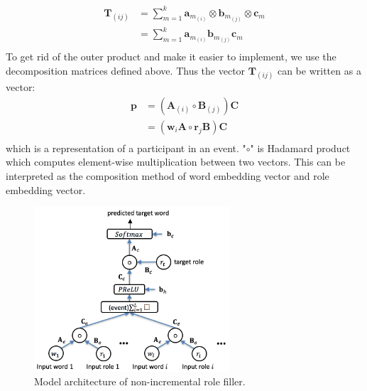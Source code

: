 \documentclass[a4paper]{article}
\begin{document}
\begin{equation} \label{eq:rbwe_tensor}
\begin{aligned}
    \mathbf{T}_{(ij)}
        &= \sum_{m=1}^{k} \mathbf{a}_{m_{(i)}} \otimes \mathbf{b}_{m_{(j)}} \otimes \mathbf{c}_m \\
        &= \sum_{m=1}^{k} \mathbf{a}_{m_{(i)}} \mathbf{b}_{m_{(j)}}  \mathbf{c}_m \\
\end{aligned}
\end{equation}
\noindent
To get rid of the outer product and make it easier to implement, we use the decomposition matrices defined above. Thus the vector $\mathbf{T}_{(ij)}$ can be written as a vector: 
\begin{equation} \label{eq:rbwe}
\begin{aligned}
    \mathbf{p} 
        &= (\mathbf{A}_{(i)}\circ \mathbf{B}_{(j)}) \mathbf{C} \\
        &= (\mathbf{w}_i \mathbf{A} \circ \mathbf{r}_j \mathbf{B}) \mathbf{C} \\
\end{aligned}
\end{equation}
which is a representation of a participant in an event. "$\circ$" is Hadamard product which computes element-wise multiplication between two vectors. This can be interpreted as the composition method of word embedding vector and role embedding vector. 



\begin{figure}[t]
\centering
\includegraphics[width=0.65\textwidth]{NNRF.png}
\caption{\label{fig:NNRF} Model architecture of non-incremental role filler.}
\end{figure}
\end{document}
